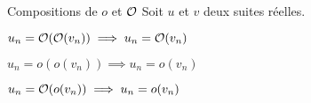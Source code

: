 

    \begin{proposition}{24.11}{Compositions de $o$ et $\mathcal{O}$}
        Soit $u$ et $v$ deux suites réelles. \begin{enumeratebf}
            \item $u_n = \mathcal{O}(\mathcal{O}(v_n)) \implies u_n = \mathcal{O}(v_n)$
            \item $u_n = o(o(v_n)) \implies u_n = o(v_n)$
            \item $u_n = \mathcal{O}(o(v_n)) \implies u_n = o(v_n)$
        \end{enumeratebf}
    \end{proposition}
